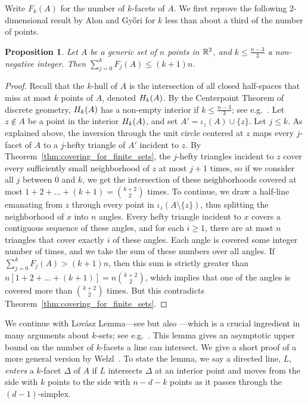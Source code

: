 \documentclass[10pt,a4paper]{article}
\newtheorem{proposition}{Proposition}[section]
\newcommand {\mm}[1] {\ifmmode{#1}\else{\mbox{\(#1\)}}\fi}
\theoremstyle{plain}
\newcommand{\Rspace}        {\mm{{\mathbb R}}}
\newcommand{\Hull}[2]       {\mm{{H}_{#1}{({#2})}}}
\begin{document}
\smallskip
Write $F_k (A)$ for the number of $k$-facets of $A$.
We first reprove the following $2$-dimensional result by Alon and Gy\H{o}ri \cite{AlGy86} for $k$ less than about a third of the number of points.
\begin{proposition}
  \label{prop:at_most_k-sets}
  Let $A$ be a generic set of $n$ points in $\Rspace^2$, and $k \leq \frac{n-3}{3}$ a non-negative integer.
  Then $\sum_{j=0}^k F_j(A) \leq (k+1) n$.
\end{proposition}
\begin{proof}
  Recall that the $k$-hull of $A$ is the intersection of all closed half-spaces that miss at most $k$ points of $A$, denoted $\Hull{k}{A}$.
  By the Centerpoint Theorem of discrete geometry, $\Hull{k}{A}$ has a non-empty interior if $k \leq \frac{n-3}{3}$; see e.g.\ \cite[Section~4.1]{Ede87}.
  Let $z \not\in A$ be a point in the interior $\Hull{k}{A}$, and set $A' = \iota_z (A) \cup \{z\}$.
  Let $j \leq k$.
  As explained above, the inversion through the unit circle centered at $z$ maps every $j$-facet of $A$ to a $j$-hefty triangle of $A'$ incident to $z$.
  By Theorem~\ref{thm:covering_for_finite_sets}, the $j$-hefty triangles incident to $z$ cover every sufficiently small neighborhood of $z$ at most $j+1$ times, so if we consider all $j$ between $0$ and $k$, we get the intersection of these neighborhoods covered at most $1+2+\ldots+(k+1) = \binom{k+2}{2}$ times.
  \smallskip
  To continue, we draw a half-line emanating from $z$ through every point in $\iota_z (A \setminus \{z\})$, thus splitting the neighborhood of $x$ into $n$ angles.
  Every hefty triangle incident to $x$ covers a contiguous sequence of these angles, and for each $i \geq 1$, there are at most $n$ triangles that cover exactly $i$ of these angles.
  Each angle is covered some integer number of times, and we take the sum of these numbers over all angles.
  If $\sum_{j=0}^k F_j(A) > (k+1)n$, then this sum is strictly greater than $n [1+2+\ldots+(k+1)] = n \binom{k+2}{2}$, which implies that one of the angles is covered more than $\binom{k+2}{2}$ times.
  But this contradicts Theorem~\ref{thm:covering_for_finite_sets}.
\end{proof}
We continue with Lov\'{a}sz Lemma---see \cite{BFL90} but also \cite[Lemma~11.3.2]{Mat02}---which is a crucial ingredient in many arguments about $k$-sets; see e.g.\ \cite{Rub24}.
This lemma gives an asymptotic upper bound on the number of $k$-facets a line can intersect.
We give a short proof of a more general version by Welzl~\cite{Wel01}.
To state the lemma, we say a directed line, $L$, \emph{enters} a $k$-facet $\Delta$ of $A$ if $L$ intersects $\Delta$ at an interior point and moves from the side with $k$ points to the side with $n-d-k$ points as it passes through the $(d-1)$-simplex.
\end{document}
